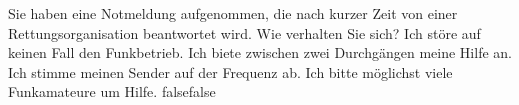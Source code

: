     {Sie haben eine Notmeldung aufgenommen, die nach kurzer Zeit von einer Rettungsorganisation beantwortet wird. Wie verhalten Sie sich?}
    {Ich störe auf keinen Fall den Funkbetrieb.}
    {Ich biete zwischen zwei Durchgängen meine Hilfe an.}
    {Ich stimme meinen Sender auf der Frequenz ab.}
    {Ich bitte möglichst viele Funkamateure um Hilfe.}
    {false}{false}